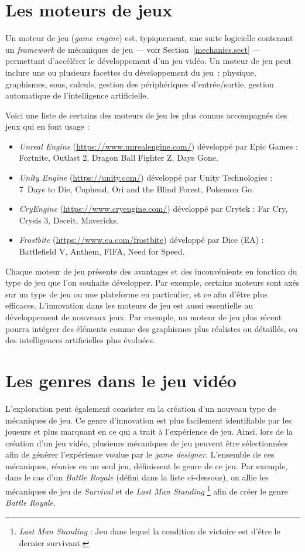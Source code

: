 \section{Les moteurs de jeux}
Un moteur de jeu (\emph{game engine}) est, typiquement, une suite logicielle contenant un \emph{framework} de mécaniques de jeu --- voir Section~\ref{mechanics.sect} --- permettant d'accélérer le développement d'un jeu vidéo.
Un moteur de jeu peut inclure une ou plusieurs facettes du développement du jeu~: physique, graphismes, sons, calculs, gestion des périphériques d'entrée/sortie, gestion automatique de l'intelligence artificielle.

Voici une liste de certains des moteurs de jeu les plus connus accompagnés des jeux qui en font usage : 
\begin{itemize}
    \item \emph{Unreal Engine} (\url{https://www.unrealengine.com/}) développé par Epic Ga\-mes : Fortnite, Outlast 2, Dragon Ball Fighter Z, Days Gone.
    \item \emph{Unity Engine} (\url{https://unity.com/}) développé par Unity Technologies : 7~Days to Die, Cuphead, Ori and the Blind Forest, Pokemon Go.
    \item \emph{CryEngine} (\url{https://www.cryengine.com/}) développé par Crytek : Far Cry, Crysis 3, Deceit, Mavericks.
    \item \emph{Frostbite} (\url{https://www.ea.com/frostbite}) développé par Dice (EA) : Battlefield V, Anthem, FIFA, Need for Speed.
\end{itemize}

Chaque moteur de jeu présente des avantages et des inconvénients en fonction du type de jeu que l'on souhaite développer.
Par exemple, certains moteurs sont axés sur un type de jeu ou une plateforme en particulier, et ce afin d'être plus efficaces. 
L'innovation dans les moteurs de jeu est aussi essentielle au développement de nouveaux jeux. 
Par exemple, un moteur de jeu plus récent pourra intégrer des éléments comme des graphismes plus réalistes ou détaillés, ou des intelligences artificielles plus évoluées.

\section{Les genres dans le jeu vidéo}
L'exploration peut également consister en la création d'un nouveau type de mécaniques de jeu.
Ce genre d'innovation est plus facilement identifiable par les joueurs et plus marquant en ce qui a trait \`a l'expérience de jeu.
Ainsi, lors de la création d'un jeu vidéo, plusieurs mécaniques de jeu peuvent être sélectionnées afin de générer l'expérience voulue par le \emph{game designer}. L'ensemble de ces mécaniques, réunies en un seul jeu, définissent le genre de ce jeu.
%
Par 
exemple, dans le cas d'un \emph{Battle Royale} (défini dans la liste ci-dessous), on allie les mécaniques de jeu de \emph{Survival} et de \emph{Last Man Standing}
\footnote{\emph{Last Man Standing} : Jeu dans lequel la condition de victoire est d'être le dernier survivant.}
afin de créer le genre \emph{Battle Royale}.


